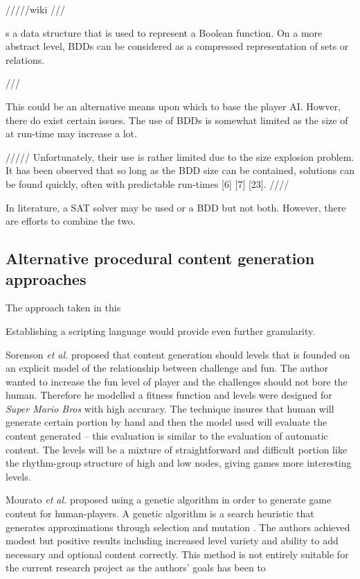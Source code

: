 \documentclass[11pt, a4paper, oneside]{report} %
\begin{document}
/////wiki ///

s a data structure that is used to represent a Boolean function. On a more abstract level, BDDs can be considered as a compressed representation of sets or relations. 

///

This could be an alternative means upon which to base the player AI. Howver, there do exist certain issues. The use of BDDs is somewhat limited as the size of at run-time may increase a lot. 

///// Unfortunately, their use is
rather limited due to the size explosion problem. It has been
observed that so long as the BDD size can be contained, solutions
can be found quickly, often with predictable run-times
[6] [7] [23].
////


In literature, a SAT solver may be used or a BDD but not both. However, there
are efforts to combine the two.

\subsection{Alternative procedural content generation approaches}

The approach taken in this

Establishing a scripting language would provide even further granularity. 

Sorenson \textit{et al.} \@\cite{sorenson2011generic} proposed that content
generation should  levels that is founded on an explicit model of the
relationship between challenge and fun. The author wanted to increase the fun
level of player and the challenges should not bore the human. Therefore he
modelled a fitness function and levels were designed for \textit{Super Mario
Bros} with high accuracy. The technique insures that human will generate certain
portion by hand and then the model used will evaluate the content generated –
this evaluation is similar to the evaluation of automatic content. The levels
will be a mixture of straightforward and difficult portion like the rhythm-group
structure of high and low nodes, giving games more interesting levels.

Mourato \textit{et al.} \cite{mourato2011automatic} proposed using a genetic
algorithm in order to generate game content for human-players. A genetic
algorithm is a search heuristic that generates approximations through selection
and mutation \cite{srinivas1994genetic}. The authors achieved modest but
positive results including increased level variety and ability to add necessary
and optional content correctly. This method is not entirely suitable for the
current research project as the authors' goals has been to
\end{document}
